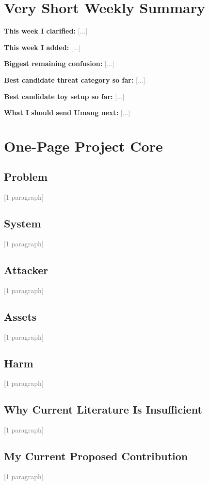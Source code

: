 \documentclass[11pt]{article}
\newcommand{\fillin}[1]{\textcolor{gray}{[#1]}}
\begin{document}
\section{Very Short Weekly Summary}

\textbf{This week I clarified:} \fillin{...}

\textbf{This week I added:} \fillin{...}

\textbf{Biggest remaining confusion:} \fillin{...}

\textbf{Best candidate threat category so far:} \fillin{...}

\textbf{Best candidate toy setup so far:} \fillin{...}

\textbf{What I should send Umang next:} \fillin{...}

\section{One-Page Project Core}

\subsection{Problem}
\fillin{1 paragraph}

\subsection{System}
\fillin{1 paragraph}

\subsection{Attacker}
\fillin{1 paragraph}

\subsection{Assets}
\fillin{1 paragraph}

\subsection{Harm}
\fillin{1 paragraph}

\subsection{Why Current Literature Is Insufficient}
\fillin{1 paragraph}

\subsection{My Current Proposed Contribution}
\fillin{1 paragraph}




\end{document}
